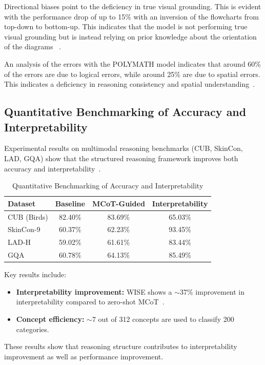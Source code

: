 \documentclass[sigconf, nonacm]{acmart}
\begin{document}
Directional biases point to the deficiency in true visual grounding. 
This is evident with the performance drop of up to 15\% with an inversion 
of the flowcharts from top-down to bottom-up. This indicates that the model 
is not performing true visual grounding but is instead relying on prior 
knowledge about the orientation of the diagrams~%
\cite{singh2024flowvqa, ramachandran2025how}.

An analysis of the errors with the POLYMATH model indicates that around 
60\% of the errors are due to logical errors, while around 25\% are due 
to spatial errors. This indicates a deficiency in reasoning consistency 
and spatial understanding~\cite{gupta2024polymath}.

\subsection{Quantitative Benchmarking of Accuracy and Interpretability}
Experimental results on multimodal reasoning benchmarks 
(CUB, SkinCon, LAD, GQA) show that the structured reasoning framework 
improves both accuracy and interpretability~\cite{jiang2025wise}.

\begin{table}[h]
\caption{Quantitative Benchmarking of Accuracy and Interpretability}
\label{tab:interpretability_benchmarks}
\centering
\begin{tabular}{lccc}
\toprule
\textbf{Dataset} & \textbf{Baseline} & \textbf{MCoT-Guided} & \textbf{Interpretability} \\
\midrule
CUB (Birds) & 82.40\% & 83.69\% & 65.03\% \\
SkinCon-9 & 60.37\% & 62.23\% & 93.45\% \\
LAD-H & 59.02\% & 61.61\% & 83.44\% \\
GQA & 60.78\% & 64.13\% & 85.49\% \\
\bottomrule
\end{tabular}
\end{table}

Key results include:
\begin{itemize}
    \item \textbf{Interpretability improvement:} WISE shows a $\sim$37\% 
    improvement in interpretability compared to zero-shot MCoT~\cite{jiang2025wise}.
    \item \textbf{Concept efficiency:} $\sim$7 out of 312 concepts are used 
    to classify 200 categories.
\end{itemize}
These results show that reasoning structure contributes to interpretability 
improvement as well as performance improvement.
\end{document}
